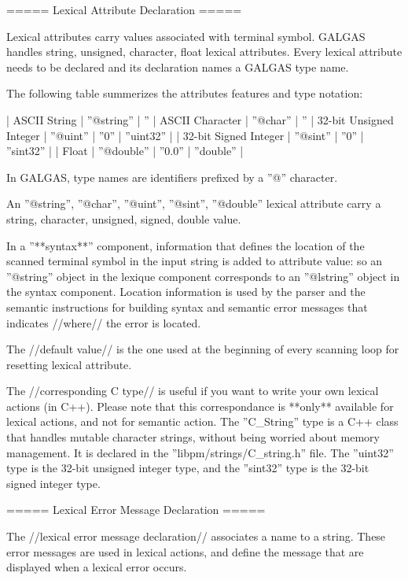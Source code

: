 ===== Lexical Attribute Declaration =====

Lexical attributes carry values associated with terminal symbol. GALGAS handles string, unsigned, character, float lexical attributes. Every lexical attribute needs to be declared and its declaration names a GALGAS type name.


 The following table summerizes the attributes features and type notation:

| ASCII String | ''@string'' | ''%
| ASCII Character | ''@char'' | ''%
| 32-bit Unsigned Integer | ''@uint'' | ''0'' | ''uint32'' |
| 32-bit Signed Integer | ''@sint'' | ''0'' | ''sint32'' |
| Float | ''@double'' | ''0.0'' | ''double'' |

In GALGAS, type names are identifiers prefixed by a ''@'' character.

An ''@string'', ''@char'', ''@uint'', ''@sint'', ''@double'' lexical attribute carry a string, character, unsigned, signed, double value.

In a ''**syntax**'' component, information that defines the location of the scanned terminal symbol in the input string is added to attribute value: so an ''@string'' object in the lexique component corresponds to an ''@lstring'' object in the syntax component. Location information is used by the parser and the semantic instructions for building syntax and semantic error messages that indicates //where// the error is located.

The //default value// is the one used at the beginning of every scanning loop for resetting lexical attribute.

The //corresponding C type// is useful if you want to write your own lexical actions (in C++). Please note that this correspondance is **only** available for lexical actions, and not for semantic action. The ''C\_String'' type is a C++ class that handles mutable character strings, without being worried about memory management. It is declared in the ''libpm/strings/C\_string.h'' file. The ''uint32'' type is the 32-bit unsigned integer type, and the ''sint32'' type is the 32-bit signed integer type. 
 

===== Lexical Error Message Declaration =====

The //lexical error message declaration// associates a name to a string. These error messages are used in lexical actions, and define the message that are displayed when a lexical error occurs.

